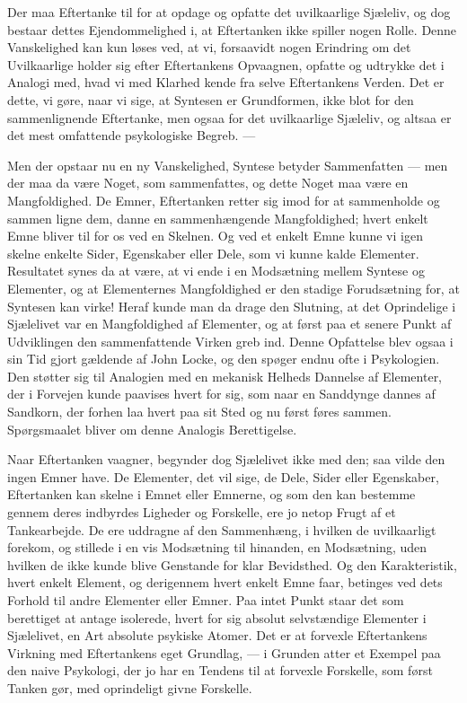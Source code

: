 \documentclass[12pt,a4paper]{book}
\newcommand{\opage}[1]{\marginnote{\footnotesize\textit{[#1]}}}
\begin{document}
Der maa Eftertanke til for at opdage og opfatte det uvilkaarlige
Sjæleliv, og dog bestaar dettes Ejendommelighed i, at Eftertanken ikke
spiller nogen Rolle. Denne Vanskelighed kan kun løses ved, at vi,
forsaavidt nogen Erindring om det Uvilkaarlige holder sig efter
Eftertankens Opvaagnen, opfatte og udtrykke det i Analogi med, hvad vi
med Klarhed kende fra selve Eftertankens Verden. Det er dette, vi gøre,
naar vi sige, at Syntesen er Grundformen, ikke blot for den
sammenlignende Eftertanke, men ogsaa for det uvilkaarlige Sjæleliv, og
altsaa er det mest omfattende psykologiske Begreb. ---

Men der opstaar nu en ny Vanskelighed, Syntese betyder Sammenfatten
--- men der maa da være Noget, som sammenfattes, og dette Noget maa
være en Mangfoldighed. De Emner, Eftertanken retter sig imod for at
sammenholde og sammen%
\opage{12}ligne dem, danne en sammenhængende
Mangfoldighed; hvert enkelt Emne bliver til for os ved en Skelnen. Og
ved et enkelt Emne kunne vi igen skelne enkelte Sider, Egenskaber
eller Dele, som vi kunne kalde Elementer. Resultatet synes da at være,
at vi ende i en Modsætning mellem Syntese og Elementer, og at
Elementernes Mangfoldighed er den stadige Forudsætning for, at
Syntesen kan virke! Heraf kunde man da drage den Slutning, at det
Oprindelige i Sjælelivet var en Mangfoldighed af Elementer, og at
først paa et senere Punkt af Udviklingen den sammenfattende Virken
greb ind. Denne Opfattelse blev ogsaa i sin Tid gjort gældende af John
Locke, og den spøger endnu ofte i Psykologien. Den støtter sig til
Analogien med en mekanisk Helheds Dannelse af Elementer, der i
Forvejen kunde paavises hvert for sig, som naar en Sanddynge dannes af
Sandkorn, der forhen laa hvert paa sit Sted og nu først føres sammen.
Spørgsmaalet bliver om denne Analogis Berettigelse.

Naar Eftertanken vaagner, begynder dog Sjælelivet ikke med den; saa
vilde den ingen Emner have. De Elementer, det vil sige, de Dele, Sider
eller Egenskaber, Eftertanken kan skelne i Emnet eller Emnerne, og som
den kan bestemme gennem deres indbyrdes Ligheder og Forskelle, ere jo
netop Frugt af et Tankearbejde. De ere uddragne af den Sammenhæng, i
hvilken de uvilkaarligt forekom, og stillede i en vis Modsætning til
hinanden, en Modsætning, uden hvilken de ikke kunde blive Genstande
for klar Bevidsthed. Og den Karakteristik, hvert enkelt Element, og
derigennem hvert enkelt Emne faar, betinges ved dets Forhold til andre
Elementer eller Emner. Paa intet Punkt staar det som berettiget at
antage isolerede, hvert for sig absolut selvstændige Elementer i
Sjælelivet, en Art absolute psykiske Atomer. Det er at forvexle
Eftertankens Virkning med Eftertankens eget Grundlag, --- i Grunden
atter et Exempel paa den naive Psykologi, der jo har en Tendens til at
forvexle Forskelle, som først Tanken gør, med oprindeligt givne
Forskelle.
\end{document}
